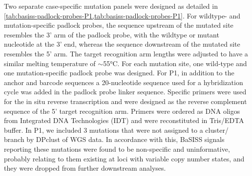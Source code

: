 Two separate case-specific mutation panels were designed as detailed in \cref{tab:basiss-padlock-probes-P1,tab:basiss-padlock-probes-P1}. For wildtype- and mutation-specific padlock probes, the sequence upstream of the mutated site resembles the 3' arm of the padlock probe, with the wildtype or mutant nucleotide at the 3' end, whereas the sequence downstream of the mutated site resembles the 5' arm. The target recognition arm lengths were adjusted to have a similar melting temperature of $\sim$55°C. For each mutation site, one wild-type and one mutation-specific padlock probe was designed. For P1, in addition to the anchor and barcode sequences a 20-nucleotide sequence used for a hybridization cycle was added in the padlock probe linker sequence. Specific primers were used for the in situ reverse transcription and were designed as the reverse complement sequence of the 5’ target recognition arm. Primers were ordered as DNA oligos from Integrated DNA Technologies (IDT) and were reconstituted in Tris/EDTA buffer. In P1, we included 3 mutations that were not assigned to a cluster/ branch by DPclust of WGS data. In accordance with this, \ac{BaSISS} signals reporting these mutations were found to be non-specific and uninformative, probably relating to them existing at loci with variable copy number states, and they were dropped from further downstream analyses. 

